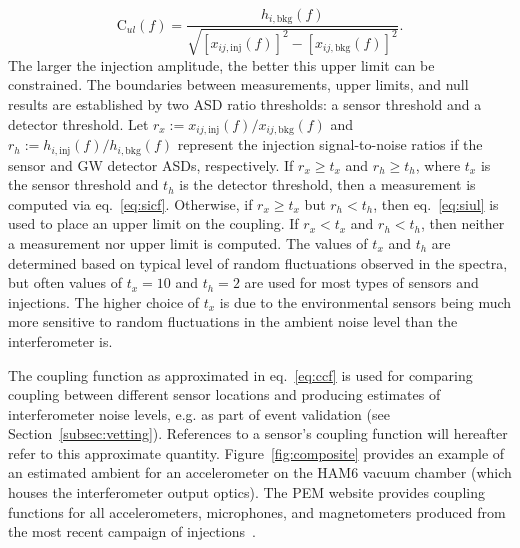 \begin{equation}\label{eq:siul}
	\mathrm{C}_{ul}(f) = \frac{h_{i,\textrm{bkg}}(f)}{\sqrt{[x_{ij,\textrm{inj}}(f)]^2 - [x_{ij,\textrm{bkg}}(f)]^2}}.
\end{equation}
The larger the injection amplitude, the better this upper limit can be constrained.
The boundaries between measurements, upper limits, and null results are established by two \ac{ASD} ratio thresholds: a sensor threshold and a detector threshold.
Let $r_x := x_{ij,\textrm{inj}}(f) / x_{ij,\textrm{bkg}}(f)$ and $r_h := h_{i,\textrm{inj}}(f) / h_{i,\textrm{bkg}}(f)$ represent the injection signal-to-noise ratios if the sensor and \ac{GW} detector \acp{ASD}, respectively.
If $r_x \geq t_x$ and $r_h \geq t_h$, where $t_x$ is the sensor threshold and $t_h$ is the detector threshold, then a measurement is computed via eq.~\ref{eq:sicf}.
Otherwise, if $r_x \geq t_x$ but $r_h < t_h$, then eq.~\ref{eq:siul} is used to place an upper limit on the coupling.
If $r_x < t_x$ and $r_h < t_h$, then neither a measurement nor upper limit is computed.
The values of $t_x$ and $t_h$ are determined based on typical level of random fluctuations observed in the spectra, but often values of $t_x = 10$ and $t_h = 2$ are used for most types of sensors and injections.
The higher choice of $t_x$ is due to the environmental sensors being much more sensitive to random fluctuations in the ambient noise level than the interferometer is.

The coupling function as approximated in eq.~\ref{eq:ccf} is used for comparing coupling between different sensor locations and producing estimates of interferometer noise levels, e.g. as part of event validation (see Section~\ref{subsec:vetting}).
References to a sensor's coupling function will hereafter refer to this approximate quantity.
Figure~\ref{fig:composite} provides an example of an estimated ambient for an accelerometer on the HAM6 vacuum chamber (which houses the interferometer output optics).
The \ac{PEM} website provides coupling functions for all accelerometers, microphones, and magnetometers produced from the most recent campaign of injections~\cite{PEM_website}.

